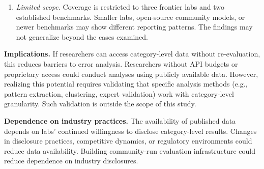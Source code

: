 \begin{enumerate}
\item \textit{Limited scope.} Coverage is restricted to three frontier labs and two established benchmarks. Smaller labs, open-source community models, or newer benchmarks may show different reporting patterns. The findings may not generalize beyond the cases examined.
\end{enumerate}

\textbf{Implications.} If researchers can access category-level data without re-evaluation, this reduces barriers to error analysis. Researchers without API budgets or proprietary access could conduct analyses using publicly available data. However, realizing this potential requires validating that specific analysis methods (e.g., pattern extraction, clustering, expert validation) work with category-level granularity. Such validation is outside the scope of this study.

\textbf{Dependence on industry practices.} The availability of published data depends on labs' continued willingness to disclose category-level results. Changes in disclosure practices, competitive dynamics, or regulatory environments could reduce data availability. Building community-run evaluation infrastructure could reduce dependence on industry disclosures.
